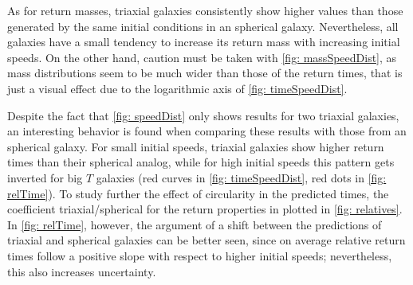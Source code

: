 	As for return masses, triaxial galaxies consistently show higher values than those generated by the same initial conditions in an spherical galaxy. Nevertheless, all galaxies have a small tendency to increase its return mass with increasing initial speeds. On the other hand, caution must be taken with \autoref{fig: massSpeedDist}, as mass distributions seem to be much wider than those of the return times, that is just a visual effect due to the logarithmic axis of \autoref{fig: timeSpeedDist}. 
	
	Despite the fact that \autoref{fig: speedDist} only shows results for two triaxial galaxies, an interesting behavior is found when comparing these results with those from an spherical galaxy. For small initial speeds, triaxial galaxies show higher return times than their spherical analog, while for high initial speeds this pattern gets inverted for big $T$ galaxies (red curves in \autoref{fig: timeSpeedDist}, red dots in \autoref{fig: relTime}). To study further the effect of circularity in the predicted times, the coefficient triaxial/spherical for the return properties in plotted in \autoref{fig: relatives}. In \autoref{fig: relTime}, however, the argument of a shift between the predictions of triaxial and spherical galaxies can be better seen, since on average relative return times follow a positive slope with respect to higher initial speeds; nevertheless, this also increases uncertainty.
